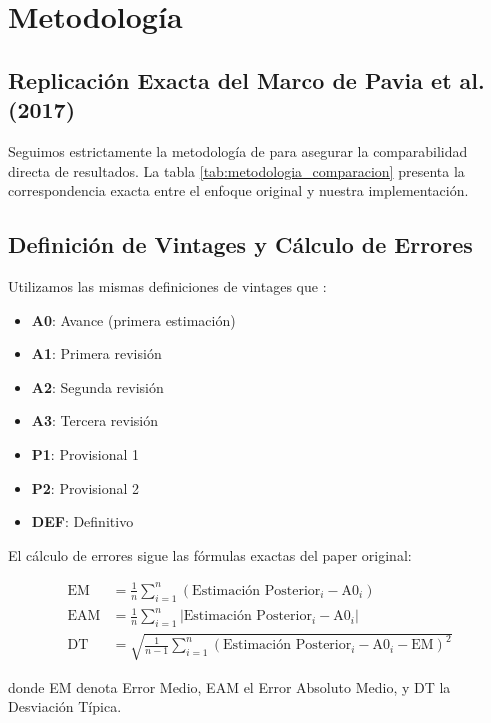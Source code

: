 \documentclass[12pt,a4paper]{article}
\begin{document}
\section{Metodología}

\subsection{Replicación Exacta del Marco de Pavia et al. (2017)}

Seguimos estrictamente la metodología de \citet{pavia2017} para asegurar la comparabilidad directa de resultados. La tabla \ref{tab:metodologia_comparacion} presenta la correspondencia exacta entre el enfoque original y nuestra implementación.



\subsection{Definición de Vintages y Cálculo de Errores}

Utilizamos las mismas definiciones de vintages que \citet{pavia2017}:

\begin{itemize}
\item \textbf{A0}: Avance (primera estimación)
\item \textbf{A1}: Primera revisión
\item \textbf{A2}: Segunda revisión  
\item \textbf{A3}: Tercera revisión
\item \textbf{P1}: Provisional 1
\item \textbf{P2}: Provisional 2
\item \textbf{DEF}: Definitivo
\end{itemize}

El cálculo de errores sigue las fórmulas exactas del paper original:

\begin{align}
\text{EM} &= \frac{1}{n}\sum_{i=1}^{n}(\text{Estimación Posterior}_i - \text{A0}_i) \label{eq:em}\\
\text{EAM} &= \frac{1}{n}\sum_{i=1}^{n}|\text{Estimación Posterior}_i - \text{A0}_i| \label{eq:eam}\\
\text{DT} &= \sqrt{\frac{1}{n-1}\sum_{i=1}^{n}(\text{Estimación Posterior}_i - \text{A0}_i - \text{EM})^2} \label{eq:dt}
\end{align}

donde EM denota Error Medio, EAM el Error Absoluto Medio, y DT la Desviación Típica.
\end{document}
